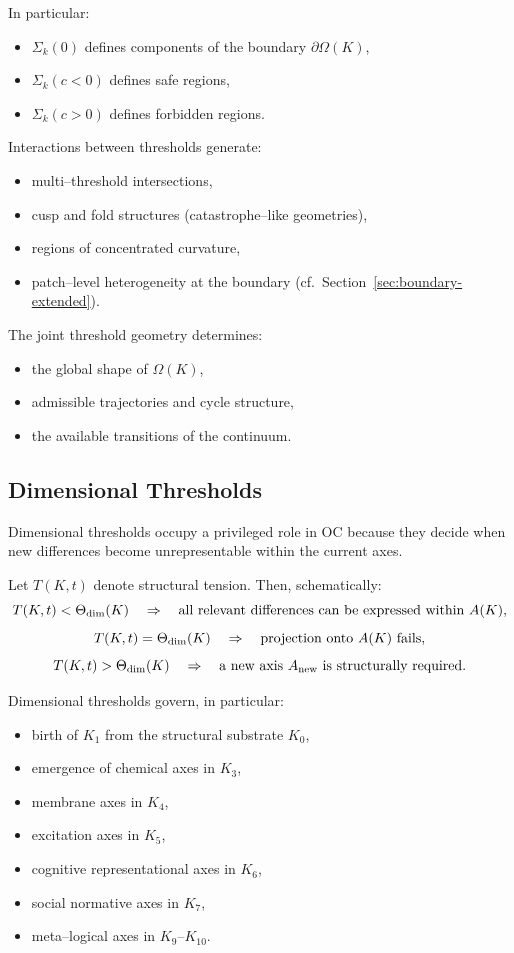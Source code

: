 In particular:
\begin{itemize}
    \item \(\Sigma_k(0)\) defines components of the boundary \(\partial\Omega(K)\),
    \item \(\Sigma_k(c<0)\) defines safe regions,
    \item \(\Sigma_k(c>0)\) defines forbidden regions.
\end{itemize}

Interactions between thresholds generate:
\begin{itemize}
    \item multi–threshold intersections,
    \item cusp and fold structures (catastrophe–like geometries),
    \item regions of concentrated curvature,
    \item patch–level heterogeneity at the boundary
          (cf.~Section~\ref{sec:boundary-extended}).
\end{itemize}

The joint threshold geometry determines:
\begin{itemize}
    \item the global shape of \(\Omega(K)\),
    \item admissible trajectories and cycle structure,
    \item the available transitions of the continuum.
\end{itemize}

\subsection{Dimensional Thresholds}

Dimensional thresholds occupy a privileged role in OC because they decide when
new differences become unrepresentable within the current axes.

Let \(T(K,t)\) denote structural tension.
Then, schematically:
\[
  T(K,t) < \Theta_{\rm dim}(K)
   \quad\Rightarrow\quad
   \text{all relevant differences can be expressed within } A(K),
\]
\[
  T(K,t) = \Theta_{\rm dim}(K)
   \quad\Rightarrow\quad
   \text{projection onto } A(K)\ \text{fails},
\]
\[
  T(K,t) > \Theta_{\rm dim}(K)
   \quad\Rightarrow\quad
   \text{a new axis } A_{\rm new} \text{ is structurally required}.
\]

Dimensional thresholds govern, in particular:
\begin{itemize}
    \item birth of \(K_1\) from the structural substrate \(K_0\),
    \item emergence of chemical axes in \(K_3\),
    \item membrane axes in \(K_4\),
    \item excitation axes in \(K_5\),
    \item cognitive representational axes in \(K_6\),
    \item social normative axes in \(K_7\),
    \item meta–logical axes in \(K_9\)–\(K_{10}\).
\end{itemize}

